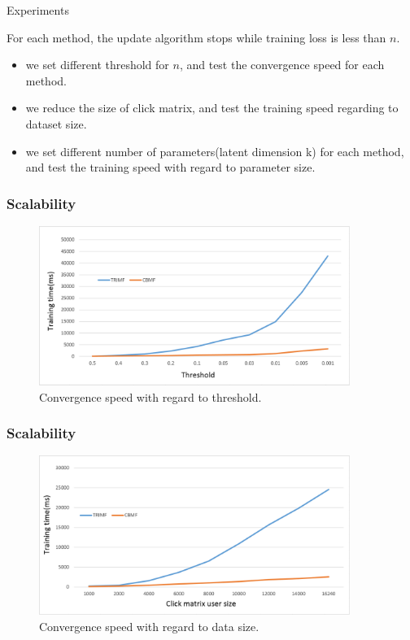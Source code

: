 \documentclass[xetex,mathserif,serif]{beamer}
\begin{document}
\begin{section}{Experiments}
\begin{frame}
For each method, the update algorithm stops while training loss is less than $n$. 

\begin{itemize}

\item we set different threshold for $n$, and test the convergence speed for each method. 
\item we reduce the size of click matrix, and test the training speed regarding to dataset size. 
\item we set different number of parameters(latent dimension k) for each method, and test the training speed with regard to parameter size. 
\end{itemize}
  \end{frame}

  \begin{frame}
    \frametitle{Scalability}
    \begin{figure}
    \begin{center}
    \includegraphics[width=0.9\textwidth]{fig/cbmf1.png} 
    \caption{Convergence speed with regard to threshold.}

  \end{center}
\end{figure}
\end{frame}

  \begin{frame}
    \frametitle{Scalability}
    \begin{figure}
    \begin{center}
    \includegraphics[width=0.9\textwidth]{fig/cbmf2.png} 
    \caption{Convergence speed with regard to data size.}


\end{center}
\end{figure}
\end{frame}
\end{section}
\end{document}
